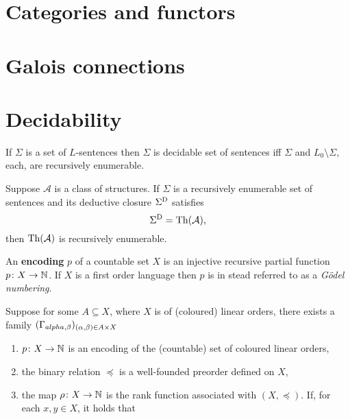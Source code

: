\section{Categories and functors}


\section{Galois connections}



\section{Decidability}

	\begin{prp}
		If $\Sigma$ is a set of $L$-sentences then $\Sigma$ is decidable set of sentences iff $\Sigma$ and $L_0\setminus\Sigma$, each, are recursively enumerable.
	\end{prp}

	\begin{prp}\label{prp:sdth}
		Suppose $\mathcal{A}$ is a class of structures.  If $\Sigma$ is a recursively enumerable set of sentences and its deductive closure ${\Sigma}^\mathrm{D}$ satisfies
		\begin{equation}
			{\Sigma}^\mathrm{D}=\operatorname{Th}(\mathcal{A}),
		\end{equation}
		then $\operatorname{Th}(\mathcal{A})$ is recursively enumerable.
	\end{prp}

	\begin{dfn}[Encoding]
		An \textbf{encoding} $p$ of a countable set $X$ is an injective recursive partial function $p\colon X\to\mathbb{N}$.  If $X$ is a first order language then $p$ is in stead referred to as a \textit{G\"odel numbering}.
	\end{dfn}

	\begin{dfn}[Frameworks]
		Suppose for some $A\subseteq X$, where $X$ is of (coloured) linear orders, there exists a family $(\Gamma_{alpha,\beta})_{(\alpha,\beta)\in A\times X}$
		\begin{enumerate}
			\item	$p\colon X\to\mathbb{N}$ is an encoding of the (countable) set of coloured linear orders,
			\item 	the binary relation $\preceq$ is a well-founded preorder defined on $X$,
			\item	the map $\rho\colon X\to\mathbb{N}$ is the rank function associated with $(X,\preceq)$.  If, for each $x,y\in X$, it holds that
		\end{enumerate}
	\end{dfn}

